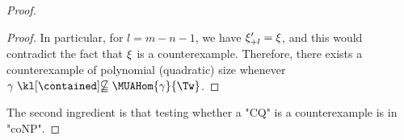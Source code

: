 \begin{proof}
\begin{proof}
	In particular, for $l=m-n-1$, we have $\xi'_{+l}=\xi$, and this would contradict the fact that $\xi$ is a counterexample.
	Therefore, there exists a counterexample of polynomial (quadratic) size whenever $\gamma \notcontained \MUAHom{\gamma}{\Tw}$.
  \end{proof}
  The second ingredient is that testing whether a "CQ" is a counterexample is in "coNP".


\end{proof}
